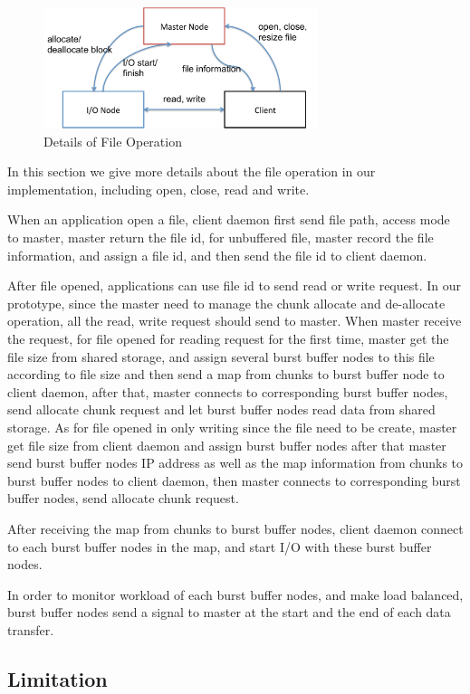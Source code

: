 \begin{figure}
\centering
\includegraphics[width=8cm]{img/file_operation}
\caption{Details of File Operation}
\label{implementation:file operation}
\end{figure}

In this section we give more details about the file operation in our implementation, including
open, close, read and write.

When an application open a file, client daemon first send file path, access mode to master,
master return the file id,
for unbuffered file, master record the file information, and assign a file id, and then send the
file id to client daemon.

After file opened, applications can use file id to send read or write request.
In our prototype, since the master need to manage the chunk allocate and de-allocate operation, all
the read, write request should send to master.
When master receive the request, for file opened for reading
request for the first time, master get the file size from shared storage, and assign several burst
buffer nodes to this file according to file size and then send a map from chunks to burst buffer
node to client daemon, after that, master connects to corresponding burst buffer nodes, send allocate chunk request and
let burst buffer nodes read data from shared storage.
As for file opened in only writing since the file need to be create, master get file size from
client daemon and assign burst buffer nodes after that master send burst buffer nodes IP address as well as the map
information from chunks to burst buffer nodes to client daemon, then master connects to
corresponding burst buffer nodes, send allocate chunk request.

After receiving the map from chunks to burst buffer nodes, client daemon connect to each burst
buffer nodes in the map, and start I/O with these burst buffer nodes.

In order to monitor workload of each burst buffer nodes, and make load balanced, burst buffer nodes send a signal to
master at the start and the end of each data transfer.

\subsection{Limitation}

